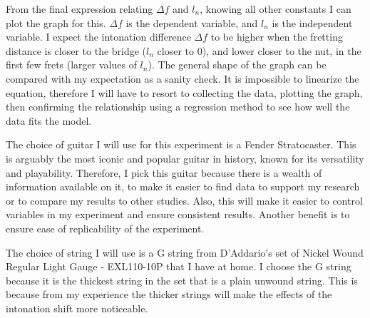 From the final expression relating $\Delta f$ and $l_n$, knowing all other constants I can plot the graph for this. $\Delta f$ is the dependent variable, and $l_n$ is the independent variable. I expect the intonation difference $\Delta f$ to be higher when the fretting distance is closer to the bridge ($l_n$ closer to 0), and lower closer to the nut, in the first few frets (larger values of $l_n$). The general shape of the graph can be compared with my expectation as a sanity check. It is impossible to linearize the equation, therefore I will have to resort to collecting the data, plotting the graph, then confirming the relationship using a regression method to see how well the data fits the model.

The choice of guitar I will use for this experiment is a Fender Stratocaster. This is arguably the most iconic and popular guitar in history, known for its versatility and playability. Therefore, I pick this guitar because there is a wealth of information available on it, to make it easier to find data to support my research or to compare my results to other studies. Also, this will make it easier to control variables in my experiment and ensure consistent results. Another benefit is to ensure ease of replicability of the experiment. 

The choice of string I will use is a G string from D'Addario's set of Nickel Wound Regular Light Gauge - EXL110-10P that I have at home. I choose the G string because it is the thickest string in the set that is a plain unwound string. This is because from my experience the thicker strings will make the effects of the intonation shift more noticeable. 